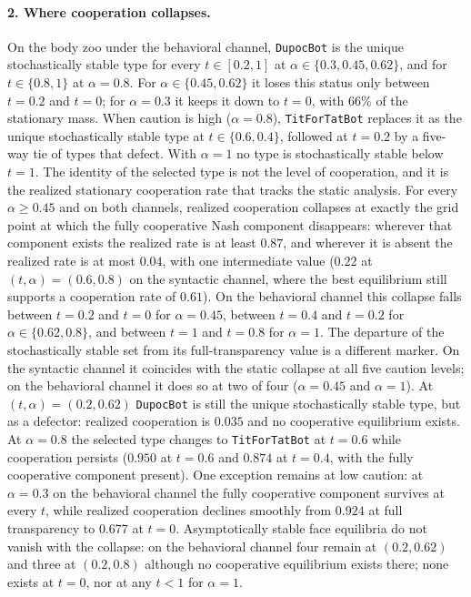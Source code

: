 \paragraph{2. Where cooperation collapses.}
On the body zoo under the behavioral channel, \texttt{DupocBot} is the unique stochastically stable type for every $t\in[0.2,1]$ at $\alpha\in\{0.3,0.45,0.62\}$, and for $t\in\{0.8,1\}$ at $\alpha=0.8$. For $\alpha\in\{0.45,0.62\}$ it loses this status only between $t=0.2$ and $t=0$; for $\alpha=0.3$ it keeps it down to $t=0$, with $66\%$ of the stationary mass. When caution is high ($\alpha=0.8$), \texttt{TitForTatBot} replaces it as the unique stochastically stable type at $t\in\{0.6,0.4\}$, followed at $t=0.2$ by a five-way tie of types that defect. With $\alpha=1$ no type is stochastically stable below $t=1$.
The identity of the selected type is not the level of cooperation, and it is the realized stationary cooperation rate that tracks the static analysis. For every $\alpha\geq 0.45$ and on both channels, realized cooperation collapses at exactly the grid point at which the fully cooperative Nash component disappears: wherever that component exists the realized rate is at least $0.87$, and wherever it is absent the realized rate is at most $0.04$, with one intermediate value ($0.22$ at $(t,\alpha)=(0.6,0.8)$ on the syntactic channel, where the best equilibrium still supports a cooperation rate of $0.61$). On the behavioral channel this collapse falls between $t=0.2$ and $t=0$ for $\alpha=0.45$, between $t=0.4$ and $t=0.2$ for $\alpha\in\{0.62,0.8\}$, and between $t=1$ and $t=0.8$ for $\alpha=1$.
The departure of the stochastically stable set from its full-transparency value is a different marker. On the syntactic channel it coincides with the static collapse at all five caution levels; on the behavioral channel it does so at two of four ($\alpha=0.45$ and $\alpha=1$). At $(t,\alpha)=(0.2,0.62)$ \texttt{DupocBot} is still the unique stochastically stable type, but as a defector: realized cooperation is $0.035$ and no cooperative equilibrium exists. At $\alpha=0.8$ the selected type changes to \texttt{TitForTatBot} at $t=0.6$ while cooperation persists ($0.950$ at $t=0.6$ and $0.874$ at $t=0.4$, with the fully cooperative component present).
One exception remains at low caution: at $\alpha=0.3$ on the behavioral channel the fully cooperative component survives at every $t$, while realized cooperation declines smoothly from $0.924$ at full transparency to $0.677$ at $t=0$.
Asymptotically stable face equilibria do not vanish with the collapse: on the behavioral channel four remain at $(0.2,0.62)$ and three at $(0.2,0.8)$ although no cooperative equilibrium exists there; none exists at $t=0$, nor at any $t<1$ for $\alpha=1$.
%

